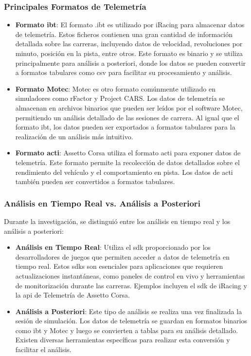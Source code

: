 \subsubsection*{Principales Formatos de Telemetría}
\begin{itemize}
    \item \textbf{Formato \ac{ibt}}: El formato .ibt es utilizado por iRacing para almacenar datos de telemetría. Estos ficheros contienen una gran cantidad de información detallada sobre las carreras, incluyendo datos de velocidad, revoluciones por minuto, posición en la pista, entre otros. Este formato es binario y se utiliza principalmente para análisis a posteriori, donde los datos se pueden convertir a formatos tabulares como \ac{csv} para facilitar su procesamiento y análisis.

    \item \textbf{Formato Motec}: Motec es otro formato comúnmente utilizado en simuladores como rFactor y Project CARS. Los datos de telemetría se almacenan en archivos binarios que pueden ser leídos por el software Motec, permitiendo un análisis detallado de las sesiones de carrera. Al igual que el formato \ac{ibt}, los datos pueden ser exportados a formatos tabulares para la realización de un  análisis más intuitivo.
    
    \item \textbf{Formato \ac{acti}}: Assetto Corsa utiliza el formato \ac{acti} para exponer datos de telemetría. Este formato permite la recolección de datos detallados sobre el rendimiento del vehículo y el comportamiento en pista. Los datos de \ac{acti} también pueden ser convertidos a formatos tabulares.
\end{itemize}

\subsubsection*{Análisis en Tiempo Real vs. Análisis a Posteriori}

Durante la investigación, se distinguió entre los análisis en tiempo real y los análisis a posteriori:

\begin{itemize}
    \item \textbf{Análisis en Tiempo Real}: Utiliza el \ac{sdk} proporcionado por los desarrolladores de juegos que permiten acceder a datos de telemetría en tiempo real. Estos \ac{sdk}s son esenciales para aplicaciones que requieren actualizaciones instantáneas, como paneles de control en vivo y herramientas de monitorización durante las carreras. Ejemplos incluyen el \ac{sdk} de iRacing y la \ac{api} de Telemetría de Assetto Corsa.
    \item \textbf{Análisis a Posteriori}: Este tipo de análisis se realiza una vez finalizada la sesión de simulación. Los datos de telemetría se guardan en formatos binarios como \ac{ibt} y Motec y luego se convierten a tablas para su análisis detallado. Existen diversas herramientas específicas para realizar esta conversión y facilitar el análisis.
\end{itemize}

